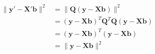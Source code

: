 \documentclass[10pt]{article}
\begin{document}
\begin{align*}\begin{split}
\lVert \boldsymbol y' - \boldsymbol X' \boldsymbol b \rVert^2 &= 
\lVert \boldsymbol Q \left( \boldsymbol y - \boldsymbol X \boldsymbol b \right) \rVert^2 \\
&= \left( \boldsymbol y - \boldsymbol X \boldsymbol b \right)^T \boldsymbol Q^T
\boldsymbol Q \left( \boldsymbol y - \boldsymbol X \boldsymbol b \right) \\
&= \left( \boldsymbol y - \boldsymbol X \boldsymbol b \right)^T \left( \boldsymbol y - \boldsymbol X \boldsymbol b \right) \\
&= \lVert \boldsymbol y - \boldsymbol X \boldsymbol b \rVert^2
\end{split}\end{align*}
\end{document}
